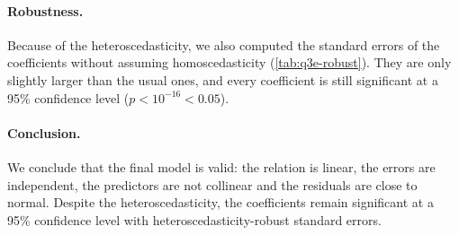 \paragraph{Robustness.}
Because of the heteroscedasticity, we also computed the standard errors of the coefficients without assuming homoscedasticity (\autoref{tab:q3e-robust}).
They are only slightly larger than the usual ones, and every coefficient is still significant at a 95\% confidence level ($p < 10^{-16} < 0.05$).

\paragraph{Conclusion.}
We conclude that the final model is valid: the relation is linear, the errors are independent, the predictors are not collinear and the residuals are close to normal.
Despite the heteroscedasticity, the coefficients remain significant at a 95\% confidence level with heteroscedasticity-robust standard errors.

